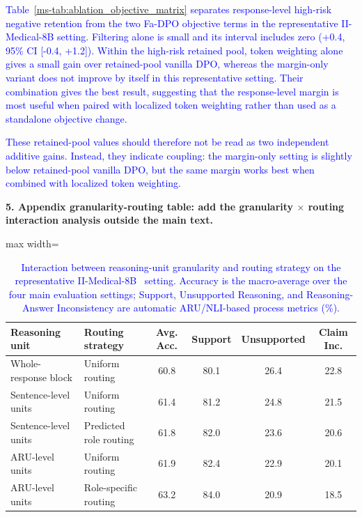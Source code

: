 \documentclass[12pt]{article}
\newcommand{\added}[1]{\textcolor{blue}{#1}}
\begin{document}
\begin{displayquote}
\added{Table~\ref*{ms-tab:ablation_objective_matrix} separates response-level high-risk
negative retention from the two Fa-DPO objective terms in the representative
II-Medical-8B setting. Filtering alone is small and its interval includes zero
(+0.4, 95\% CI [-0.4, +1.2]). Within the high-risk retained pool, token weighting
alone gives a small gain over retained-pool vanilla DPO, whereas the margin-only
variant does not improve by itself in this representative setting. Their
combination gives the best result, suggesting that the response-level margin is
most useful when paired with localized token weighting rather than used as a
standalone objective change.}
\end{displayquote}

\begin{displayquote}
\added{These retained-pool values should therefore not be read as two independent
additive gains. Instead, they indicate coupling: the margin-only setting is
slightly below retained-pool vanilla DPO, but the same margin works best when
combined with localized token weighting.}
\end{displayquote}

\textbf{5. Appendix granularity-routing table: add the
granularity $\times$ routing interaction analysis outside the main text.}

\begin{table}[htbp]
\centering
\small
\caption{\added{Interaction between reasoning-unit granularity and routing strategy on the representative II-Medical-8B~\cite{intelligentinternet2025iimedical8b} setting. Accuracy is the macro-average over the four main evaluation settings; Support, Unsupported Reasoning, and Reasoning-Answer Inconsistency are automatic ARU/NLI-based process metrics (\%).}}
\label{tab:response_r114_granularity_routing}
\label{tab:ablation_granularity_routing}
\begin{adjustbox}{max width=\textwidth}
\begingroup\color{blue}
\begin{tabular}{llcccc}
\toprule
\textbf{Reasoning unit} & \textbf{Routing strategy} & \textbf{Avg. Acc.} & \textbf{Support} & \textbf{Unsupported} & \textbf{Claim Inc.} \\
\midrule
Whole-response block & Uniform routing & 60.8 & 80.1 & 26.4 & 22.8 \\
Sentence-level units & Uniform routing & 61.4 & 81.2 & 24.8 & 21.5 \\
Sentence-level units & Predicted role routing & 61.8 & 82.0 & 23.6 & 20.6 \\
ARU-level units & Uniform routing & 61.9 & 82.4 & 22.9 & 20.1 \\
ARU-level units & Role-specific routing & 63.2 & 84.0 & 20.9 & 18.5 \\
\bottomrule
\end{tabular}
\endgroup
\end{adjustbox}
\end{table}
\end{document}
